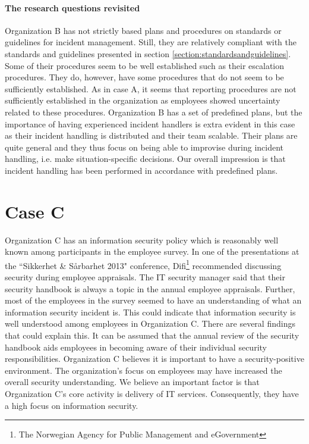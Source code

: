 \paragraph{The research questions revisited}
Organization B has not strictly based plans and procedures on standards or guidelines for incident management. Still, they are relatively compliant with the standards and guidelines presented in section \ref{section:standardsandguidelines}. Some of their procedures seem to be well established such as their escalation procedures. They do, however, have some procedures that do not seem to be sufficiently established. As in case A, it seems that reporting procedures are not sufficiently established in the organization as employees showed uncertainty related to these procedures. Organization B has a set of predefined plans, but the importance of having experienced incident handlers is extra evident in this case as their incident handling is distributed and their team scalable. Their plans are quite general and they thus focus on being able to improvise during incident handling, i.e. make situation-specific decisions. Our overall impression is that incident handling has been performed in accordance with predefined plans.

\section{Case C}
\label{sec:discussionCaseC}
Organization C has an information security policy which is reasonably well known among participants in the employee survey. In one of the presentations at the ``Sikkerhet \& S\aa rbarhet 2013" conference, Difi\footnote{The Norwegian Agency for Public Management and eGovernment} recommended discussing security during employee appraisals. The IT security manager said that their security handbook is always a topic in the annual employee appraisals. Further, most of the employees in the survey seemed to have an understanding of what an information security incident is. This could indicate that information security is well understood among employees in Organization C. There are several findings that could explain this. It can be assumed that the annual review of the security handbook aids employees in becoming aware of their individual security responsibilities. Organization C believes it is important to have a security-positive environment. The organization's focus on employees may have increased the overall security understanding. We believe an important factor is that Organization C's core activity is delivery of IT services. Consequently, they have a high focus on information security.

